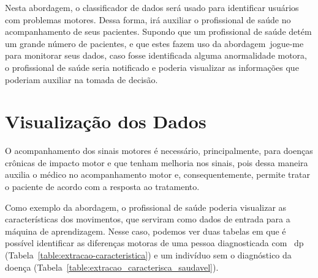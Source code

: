 Nesta abordagem, o classificador de dados será usado para identificar usuários com problemas motores. Dessa forma, irá auxiliar o profissional de saúde no acompanhamento de seus pacientes. Supondo que um profissional de saúde detém um grande número de pacientes, e que estes fazem uso da abordagem~\ac{jogue-me} para monitorar seus dados, caso fosse identificada alguma anormalidade motora, o profissional de saúde seria notificado e poderia visualizar as informações que poderiam auxiliar na tomada de decisão.





\section{Visualização dos Dados}
O acompanhamento dos sinais motores é necessário, principalmente, para doenças crônicas de impacto motor e que tenham melhoria nos sinais, pois dessa maneira auxilia o médico no acompanhamento motor e, consequentemente, permite tratar o paciente de acordo com a resposta ao tratamento.

Como exemplo da abordagem, o profissional de saúde poderia visualizar as características dos movimentos, que serviram como dados de entrada para a máquina de aprendizagem. Nesse caso, podemos ver duas tabelas em que é possível identificar as diferenças motoras de uma pessoa diagnosticada com ~\ac{dp} (Tabela~\ref{table:extracao-caracteristica}) e um indivíduo sem o diagnóstico da doença (Tabela~\ref{table:extracao_caracterisca_saudavel}).

